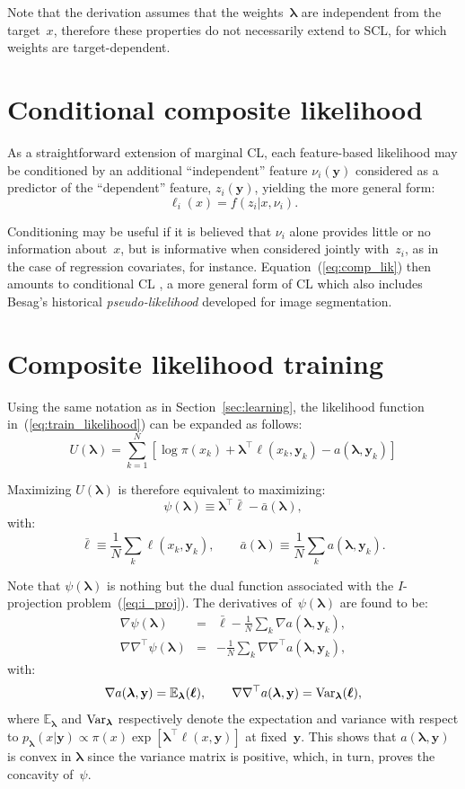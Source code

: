 \documentclass[english]{scrartcl}
\def\y{{\mathbf{y}}}
\newcommand{\blambda}{{\boldsymbol{\lambda}}}
\newcommand{\bell}{{\boldsymbol{\ell}}}
\newcommand{\E}{\mathbb{E}}
\begin{document}
Note that the derivation assumes that the weights~$\blambda$ are independent from the target~$x$, therefore these properties do not necessarily extend to SCL, for which weights are target-dependent.


\section{Conditional composite likelihood}
\label{app:conditional}

As a straightforward  extension of marginal CL, each feature-based likelihood may be conditioned by an additional ``independent'' feature $\nu_i(\y)$ considered as a predictor of the ``dependent'' feature, $z_i(\y)$, yielding the more general form:
\begin{equation}
\label{eq:cond_feat_lik}
\ell_i(x) = f(z_i|x,\nu_i).
\end{equation}

Conditioning may be useful if it is believed that $\nu_i$ alone provides little or no information about~$x$, but is informative when considered jointly with~$z_i$, as in the case of regression covariates, for instance. Equation~(\ref{eq:comp_lik}) then amounts to conditional CL \cite{Varin-11}, a more general form of CL which also includes Besag's historical {\em pseudo-likelihood} \cite{Besag-74} developed for image segmentation.


\section{Composite likelihood training}
\label{app:training}

Using the same notation as in Section~\ref{sec:learning}, the likelihood function in~(\ref{eq:train_likelihood}) can be expanded as follows:
$$
U(\blambda) 
= \sum_{k=1}^N \left[
\log \pi(x_k) + \blambda^\top \bell(x_k, \y_k) - a(\blambda,\y_k)
\right]
$$

Maximizing $U(\blambda)$ is therefore equivalent to maximizing: 
$$
\psi(\blambda) \equiv \blambda^\top \bar{\bell} - \bar{a}(\blambda), 
$$
with:
$$
\bar{\bell} \equiv \frac{1}{N} \sum_k \bell(x_k,\y_k),
\qquad
\bar{a}(\blambda) \equiv \frac{1}{N} \sum_k a(\blambda,\y_k).
$$

Note that $\psi(\blambda)$ is nothing but the dual function associated with the $I$-projection problem~(\ref{eq:i_proj}). The derivatives of~$\psi(\blambda)$ are found to be:
\begin{eqnarray*}
\nabla\psi(\blambda)
 & = & \bar{\bell} - \frac{1}{N} \sum_k \nabla a(\blambda,\y_k), \\
\nabla\nabla^\top\psi(\blambda)
 & = & - \frac{1}{N} \sum_k \nabla \nabla^\top a(\blambda,\y_k),
\end{eqnarray*}
with:
$$
\nabla a(\blambda,\y) = \E_{\blambda}(\bell),
\qquad
\nabla \nabla^\top a(\blambda,\y) = {\rm Var}_{\blambda}(\bell),
$$
where $\E_{\blambda}$ and ${\rm Var}_{\blambda}$ respectively denote the expectation and variance with respect to $p_\blambda(x|\y)\propto \pi(x)\exp[\blambda^\top \bell(x,\y)]$ at fixed~$\y$. This shows that $a(\blambda,\y)$ is convex in $\blambda$ since the variance matrix is positive, which, in turn, proves the concavity of~$\psi$.
\end{document}
